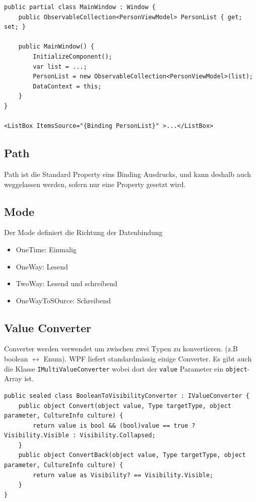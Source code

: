 \begin{lstlisting}[caption=Dynamisches Data Binding]
public partial class MainWindow : Window {
	public ObservableCollection<PersonViewModel> PersonList { get; set; }

	public MainWindow() {
		InitializeComponent();
		var list = ...;
		PersonList = new ObservableCollection<PersonViewModel>(list);
		DataContext = this;        
	}
}

<ListBox ItemsSource="{Binding PersonList}" >...</ListBox>
\end{lstlisting}


\subsection{Path}
Path ist die Standard Property eins Binding Ausdrucks, und kann deshalb auch weggelassen werden, sofern nur eine Property gesetzt wird. 

\subsection{Mode}
Der Mode definiert die Richtung der Datenbindung
\begin{itemize}
	\item OneTime: Einmalig
	\item OneWay: Lesend
	\item TwoWay: Lesend und schreibend
	\item OneWayToSOurce: Schreibend
\end{itemize}

\subsection{Value Converter}
Converter werden verwendet um zwischen zwei Typen zu konvertieren. (z.B boolean $\leftrightarrow$ Enum). WPF liefert standardmässig einige Converter. Es gibt auch die Klasse \lstinline|IMultiValueConverter| wobei dort der \lstinline|value| Parameter ein \lstinline|object|-Array ist.
\begin{lstlisting}[caption=Dynamisches Data Binding]
public sealed class BooleanToVisibilityConverter : IValueConverter {
	public object Convert(object value, Type targetType, object parameter, CultureInfo culture) {
		return value is bool && (bool)value == true ? Visibility.Visible : Visibility.Collapsed;
	}
	public object ConvertBack(object value, Type targetType, object parameter, CultureInfo culture) {
		return value as Visibility? == Visibility.Visible;
	}
}
\end{lstlisting}

